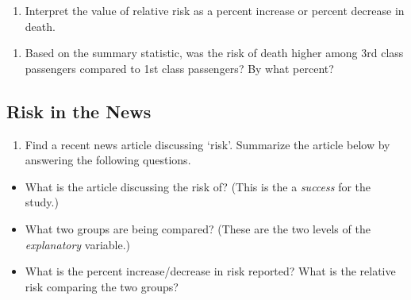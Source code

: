 \documentclass[
]{report}
\providecommand{\tightlist}{%
  \setlength{\itemsep}{0pt}\setlength{\parskip}{0pt}}
\begin{document}
\vspace{0.5in}

\begin{enumerate}
\def\labelenumi{\arabic{enumi}.}
\setcounter{enumi}{10}
\tightlist
\item
  Interpret the value of relative risk as a percent increase or percent decrease in death.
\end{enumerate}

\vspace{0.8in}

\begin{enumerate}
\def\labelenumi{\arabic{enumi}.}
\setcounter{enumi}{11}
\tightlist
\item
  Based on the summary statistic, was the risk of death higher among 3rd class passengers compared to 1st class passengers? By what percent?
\end{enumerate}

\vspace{0.8in}

\hypertarget{risk-in-the-news}{%
\subsection{Risk in the News}\label{risk-in-the-news}}

\begin{enumerate}
\def\labelenumi{\arabic{enumi}.}
\setcounter{enumi}{12}
\tightlist
\item
  Find a recent news article discussing `risk'. Summarize the article below by answering the following questions.
\end{enumerate}

\begin{itemize}
\tightlist
\item
  What is the article discussing the risk of? (This is the a \emph{success} for the study.)
\end{itemize}

\vspace{0.5in}

\begin{itemize}
\tightlist
\item
  What two groups are being compared? (These are the two levels of the \emph{explanatory} variable.)
\end{itemize}

\vspace{0.5in}

\begin{itemize}
\tightlist
\item
  What is the percent increase/decrease in risk reported? What is the relative risk comparing the two groups?
\end{itemize}
\end{document}
